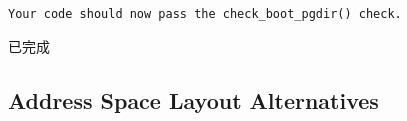 \documentclass{article}
\begin{document}
\begin{CJK*}{UTF8}{gkai}
\begin{lstlisting}[style=exercise]
Your code should now pass the check_boot_pgdir() check.
\end{lstlisting}
已完成

\subsection{Address Space Layout Alternatives}




\begin{lstlisting}[style=console]
\end{lstlisting}

\begin{lstlisting}[style=console]
\end{lstlisting}

\begin{lstlisting}[style=console]
\end{lstlisting}

\begin{lstlisting}[style=console]
\end{lstlisting}









\begin{lstlisting}[style=exercise]
\end{lstlisting}


\begin{lstlisting}[style=challenge]
\end{lstlisting}

\begin{lstlisting}[style=challenge]
\end{lstlisting}

\begin{lstlisting}[style=challenge]
\end{lstlisting}








\clearpage

\end{CJK*}
\end{document}
